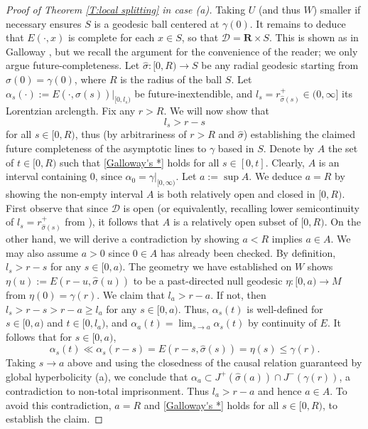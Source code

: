 \documentclass[12pt]{amsart}
\newcommand{\R}{{\mathbf R}}
\begin{document}
\begin{proof}[Proof of Theorem \ref{T:local splitting} in case (a)]
Taking 
$U$ (and thus $W$) smaller if necessary ensures $S$ is a geodesic ball centered at $\gamma(0)$.
It remains to deduce that 
$E(\cdot,x)$ is complete for each $x \in S$,
so that $\mathcal{D} = \R \times S$.
This is shown as in Galloway \cite[p.\ 383]{Galloway89}, but we recall the argument for the convenience of the reader; 
we only argue future-completeness. Let $\hat\sigma:[0,R) \to S$ be any radial geodesic starting from $\hat\sigma(0)=\gamma(0)$, where $R$ is the radius of the ball $S$. Let $\alpha_s(\cdot):=E(\cdot,\hat\sigma(s))|_{[0,l_s)}$ be future-inextendible, and $l_s =r^+_{\hat\sigma(s)}\in (0,\infty]$ its Lorentzian arclength.
Fix any $r > R$. We will now show that 
\begin{equation}\label{Galloway's *}
    l_s > r - s
\end{equation}
for all $s \in [0,R)$, thus (by arbitrariness of $r>R$ and $\hat\sigma$) establishing the claimed future completeness of the asymptotic lines to $\gamma$ based in $S$. Denote by $A$ the set of $t \in [0,R)$ such that \eqref{Galloway's *} holds for all $s \in [0,t]$. Clearly, $A$ is an interval containing $0$, since $\alpha_0 = \gamma|_{[0,\infty)}$. Let $a:=\sup A$. We  deduce
$a=R$ by showing the non-empty interval $A$ is both relatively open and closed in $[0,R)$.  
First observe that
since $\mathcal D$ is open (or equivalently, recalling lower semicontinuity of $l_s = r^+_{\hat\sigma(s)}$ from \cite[Proposition 9.7]{BeemEhrlichEasley96}), 
it follows that $A$
is a relatively open subset of $[0,R)$.
On the other hand, we will derive a contradiction by
showing $a< R$ implies $a \in A$. We may also assume $a > 0$ since $0 \in A$ has already been checked. By definition, $l_s > r - s$ for any $s \in [0,a)$. 
The geometry we have established on $W$ shows $\eta(u):=E(r-u,\hat\sigma(u))$ to be a past-directed null geodesic $\eta:[0,a) \to M$ from $\eta(0) = \gamma(r)$. We claim that $l_a > r - a$. If not, then $l_s > r - s > r - a \geq l_a$ for any $s \in [0,a)$. Thus, $\alpha_s(t)$ is well-defined for $s \in [0,a)$ and $t \in [0,l_a)$, and $\alpha_a(t) = \lim_{s \to a} \alpha_s(t)$ by continuity of $E$. It follows that for $s \in [0,a)$,
\begin{equation*}
    \alpha_s(t) \ll \alpha_s(r - s) = E(r-s,\hat\sigma(s)) = \eta(s) \leq \gamma(r).
\end{equation*}
Taking $s \to a$ above and using the closedness of the causal relation guaranteed by global hyperbolicity (a), we conclude that $\alpha_a \subset J^+(\hat\sigma(a)) \cap J^-(\gamma(r))$, a contradiction to non-total imprisonment. Thus $l_a > r -a$ and hence $a \in A$. 
To avoid this contradiction, $a = R$ and \eqref{Galloway's *} holds for all $s \in [0,R)$, to establish the claim.
\end{proof}
\end{document}
